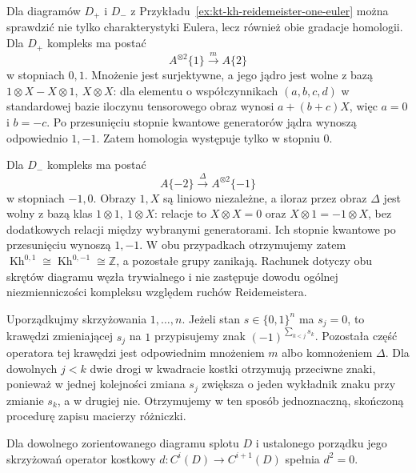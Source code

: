 \begin{przyklad}
\label{ex:kt-kh-reidemeister-one-homology}
Dla diagramów $D_+$ i $D_-$ z
Przykładu~\ref{ex:kt-kh-reidemeister-one-euler}
można sprawdzić nie tylko charakterystyki Eulera,
lecz również obie gradacje homologii.
Dla $D_+$ kompleks ma postać
\[
 A^{\otimes2}\{1\}\xrightarrow{m}A\{2\}
\]
w stopniach $0,1$. Mnożenie jest surjektywne,
a jego jądro jest wolne z bazą
$1\otimes X-X\otimes1,\ X\otimes X$:
dla elementu o współczynnikach $(a,b,c,d)$
w standardowej bazie iloczynu tensorowego obraz
wynosi $a+(b+c)X$, więc $a=0$ i $b=-c$.
Po przesunięciu stopnie kwantowe generatorów
jądra wynoszą odpowiednio $1,-1$.
Zatem homologia występuje tylko w stopniu $0$.

Dla $D_-$ kompleks ma postać
\[
 A\{-2\}\xrightarrow{\Delta}A^{\otimes2}\{-1\}
\]
w stopniach $-1,0$. Obrazy $1,X$ są liniowo
niezależne, a iloraz przez obraz $\Delta$
jest wolny z bazą klas $1\otimes1,\ 1\otimes X$:
relacje to $X\otimes X=0$ oraz
$X\otimes1=-1\otimes X$, bez dodatkowych relacji
między wybranymi generatorami. Ich stopnie kwantowe
po przesunięciu wynoszą $1,-1$.
W obu przypadkach otrzymujemy zatem
$\operatorname{Kh}^{0,1}\cong
\operatorname{Kh}^{0,-1}\cong\mathbb Z$,
a pozostałe grupy zanikają.
Rachunek dotyczy obu skrętów diagramu węzła
trywialnego i nie zastępuje dowodu ogólnej
niezmienniczości kompleksu względem ruchów Reidemeistera.
\end{przyklad}

\begin{uwaga}
Uporządkujmy skrzyżowania $1,\dots,n$. Jeżeli stan
$s\in\{0,1\}^n$ ma $s_j=0$, to krawędzi zmieniającej
$s_j$ na $1$ przypisujemy znak
$(-1)^{\sum_{k<j}s_k}$. Pozostała część operatora tej
krawędzi jest odpowiednim mnożeniem $m$ albo
komnożeniem $\Delta$. Dla dowolnych $j<k$ dwie
drogi w kwadracie kostki otrzymują przeciwne znaki,
ponieważ w jednej kolejności zmiana $s_j$ zwiększa
o jeden wykładnik znaku przy zmianie $s_k$, a w drugiej
nie. Otrzymujemy w ten sposób jednoznaczną, skończoną
procedurę zapisu macierzy różniczki.
\end{uwaga}

\begin{stwierdzenie}
Dla dowolnego zorientowanego diagramu splotu $D$ i ustalonego
porządku jego skrzyżowań operator kostkowy
$d:C^i(D)\to C^{i+1}(D)$ spełnia $d^2=0$.
\end{stwierdzenie}

